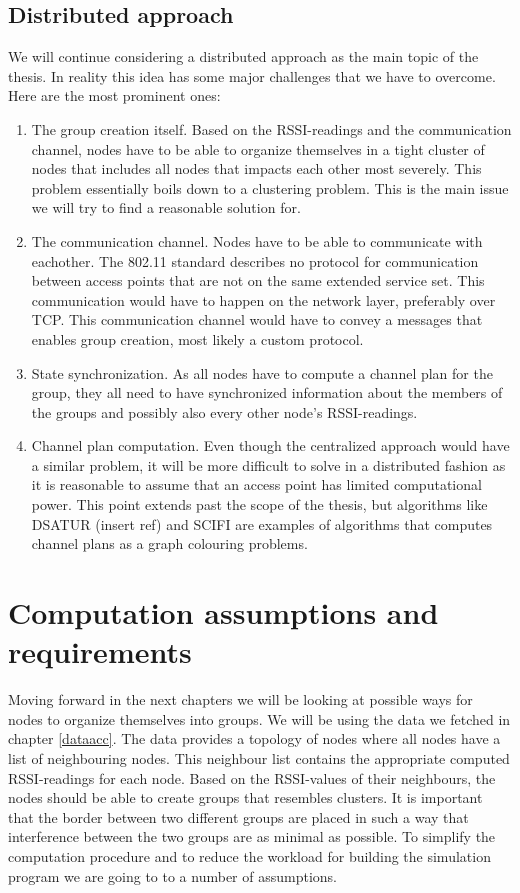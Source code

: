 \subsection{Distributed approach}
We will continue considering a distributed approach as the main topic of the thesis. In reality this idea has some major challenges that we have to overcome. Here are the most prominent ones: 
\begin{enumerate}
	\item The group creation itself. Based on the RSSI-readings and the communication channel, nodes have to be able to organize themselves in a tight cluster of nodes that
		includes all nodes that impacts each other most severely. This problem essentially boils down to a clustering problem. This is the main issue we will
		try to find a reasonable solution for. 
	\item The communication channel. Nodes have to be able to communicate with eachother. The 802.11 standard describes no protocol for communication between access points that are not on the same extended service set. This communication would have to happen on the network layer, preferably over TCP. This communication channel would have to convey a messages that enables group creation,
		most likely a custom protocol. 	
	\item State synchronization. As all nodes have to compute a channel plan for the group, they all need to have synchronized information about the members of the groups
		and possibly also every other node's RSSI-readings. 
	\item Channel plan computation. Even though the centralized approach would have a similar problem, it will be more difficult to solve in a distributed fashion as 
		it is reasonable to assume that an access point has limited computational power. This point extends past the scope of the thesis, but algorithms like DSATUR {{(insert ref)}}
		and SCIFI are examples of algorithms that computes channel plans as a graph colouring problems.
\end{enumerate}

\section{Computation assumptions and requirements}
Moving forward in the next chapters we will be looking at possible ways for nodes to organize themselves into groups.
We will be using the data we fetched in chapter \ref{dataacc}. The data provides a topology of nodes where all nodes have a list of neighbouring nodes.
This neighbour list contains the appropriate computed RSSI-readings for each node. Based on the RSSI-values of their neighbours, the nodes should be able to create groups that resembles
clusters. It is important that the border between two different groups are placed in such a way that interference between the two groups are as minimal as possible. To simplify the computation procedure and to reduce the workload for building the simulation program we are going to to a number of assumptions. 

